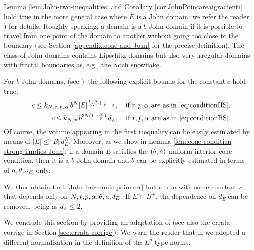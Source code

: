 \documentclass[a4paper,10pt]{amsart}
\numberwithin{equation}{section}
\begin{document}
\begin{rem}\label{rem:on the proof of John and Poincare}
{\rm	
Lemma \ref{lem:John-two-inequalities} and Corollary \ref{cor:JohnPoincareaigradienti} hold true in the more general case where $E$ is a John domain: we refer the reader \cite[proof of item(i) of Lemma 2.1 and item (i) of Corollary 2.3]{MP3}) for details. 
	Roughly speaking, a domain is a $b$-John domain if it is possible to travel from one point of the domain to another without going too close to the boundary (see Section \ref{appendix:cone and John} for the precise definition).
The class of John domains contains Lipschitz domains but also very irregular domains with fractal boundaries as, e.g., the Koch snowflake.
	
For $b$-John domains, (see \cite[items (i),(ii) of Remark 2.4]{MP3}), the following explicit bounds for the constant $c$ hold true:
	\begin{eqnarray*}
&&c \le k_{N,\, r, \, p,\, \alpha} \, b^N |E|^{\frac{1-\alpha}{N} +\frac{1}{r} - \frac{1}{p} } , \quad \text{if $r, p, \alpha$ are as in \eqref{eq:conditionHS}}, \\
&&c \le k_{N, \, p} \, b^{3N(1 + \frac{N}{p})} \, d_E , \quad \text{if $r,p, \alpha$ are as in \eqref{eq:conditionBS}}.
	\end{eqnarray*}
Of course, the volume appearing in the first inequality can be easily estimated by means of $|E| \le |B|\, d_E^N$.
Moreover, as we show in Lemma \ref{lem:cone condition strong implies John}, if a domain $E$ satisfies the $(\theta,a)$-uniform interior cone condition, then it is a $b$-John domain and $b$ can be explicitly estimated in terms of $a, \theta, d_E$ only.

We thus obtain that \eqref{John-harmonic-poincare} holds true with some constant $c$ that
%
%
depends only on $N, r, p, \alpha, \theta, a, d_E$. 
If $E \subset B^+$, the dependence on $d_E$ can be removed, being as $d_E \le 2$.
}
\end{rem}

We conclude this section by providing an adaptation of \cite[Theorems 2.4 and 2.7]{MP6} (see also the errata corrige in Section \ref{sec:errata corrige}). We warn the reader that in \cite{MP6} we adopted a different normalization in the definition of the $L^p$-type norms. 
\end{document}
